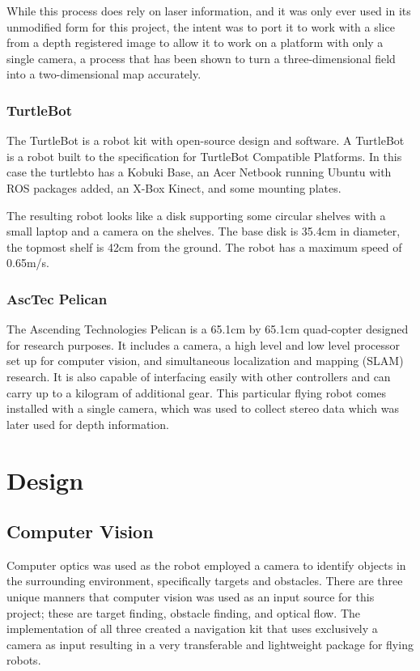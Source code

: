 \documentclass{article}[12]
\begin{document}
		While this process does rely on laser information, and it was only ever used in its unmodified form for this project, the intent was to port it to work with a slice from a depth registered image to allow it to work on a platform with only a single camera, a process that has been shown to turn a three-dimensional field into a two-dimensional map accurately.\cite{2018nanomap}
		
		
		\subsubsection{TurtleBot}
		
		The TurtleBot is a robot kit with open-source design and software. A TurtleBot is a robot built to the specification for TurtleBot Compatible Platforms\cite{wise_foote_2011}. In this case the turtlebto has a Kobuki Base, an Acer Netbook running Ubuntu with ROS packages added, an X-Box Kinect, and some mounting plates. 
		
		The resulting robot looks like a disk supporting some circular shelves with a small laptop and a camera on the shelves. The base disk is 35.4cm in diameter, the topmost shelf is 42cm from the ground. The robot has a maximum speed of 0.65m/s. 
		
		\subsubsection{AscTec Pelican}
		
		The Ascending Technologies Pelican is a 65.1cm by 65.1cm quad-copter designed for research purposes\cite{asctec}. It includes a camera, a high level and low level processor set up for computer vision, and simultaneous localization and mapping (SLAM) research. It is also capable of interfacing easily with other controllers and can carry up to a kilogram of additional gear. This particular flying robot comes installed with a single camera, which was used to collect stereo data which was later used for depth information.

		
\section{Design}
	
	\subsection{Computer Vision}
	
	Computer optics was used as the robot employed a camera to identify objects in the surrounding environment, specifically targets and obstacles. There are three unique manners that computer vision was used as an input source for this project; these are target finding, obstacle finding, and optical flow. The implementation of all three created a navigation kit that uses exclusively a camera as input resulting in a very transferable and lightweight package for flying robots.
	
\end{document}
